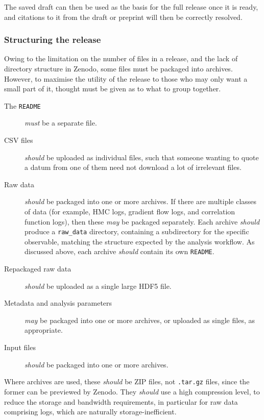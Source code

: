 \documentclass{article}
\newcommand\rfcword[1]{\emph{#1}\xspace}
\newcommand\must{\rfcword{must}}
\newcommand\should{\rfcword{should}}
\newcommand\may{\rfcword{may}}
\newcommand\filename[1]{\texttt{#1}\xspace}
\newcommand\readme{\filename{README}\xspace}
\begin{document}
The saved draft can then be used as the basis for the full release once it is ready,
and citations to it from the draft or preprint will then be correctly resolved.

\subsubsection{Structuring the release}

Owing to the limitation on the number of files in a release,
and the lack of directory structure in Zenodo,
some files must be packaged into archives.
However,
to maximise the utility of the release to
those who may only want a small part of it,
thought must be given as to what to group together.

\begin{description}
  \item[The \readme]
        \must be a separate file.
  \item[CSV files]
        \should be uploaded as individual files,
        such that someone wanting to quote a datum from one of them
        need not download a lot of irrelevant files.
  \item[Raw data]
        \should be packaged into one or more archives.
        If there are multiple classes of data
        (for example,
        HMC logs, gradient flow logs, and correlation function logs),
        then these \may be packaged separately.
        Each archive \should produce a \filename{raw\_data} directory,
        containing a subdirectory for the specific observable,
        matching the structure expected by the analysis workflow.
        As discussed above,
        each archive \should contain its own \readme.
  \item[Repackaged raw data]
        \should be uploaded as a single large HDF5 file.
  \item[Metadata and analysis parameters]
        \may be packaged into one or more archives,
        or uploaded as single files,
        as appropriate.
  \item[Input files]
        \should be packaged into one or more archives.
\end{description}

Where archives are used,
these \should be ZIP files,
not \filename{.tar.gz} files,
since the former can be previewed by Zenodo.
They \should use a high compression level,
to reduce the storage and bandwidth requirements,
in particular for raw data comprising logs,
which are naturally storage-inefficient.
\end{document}
